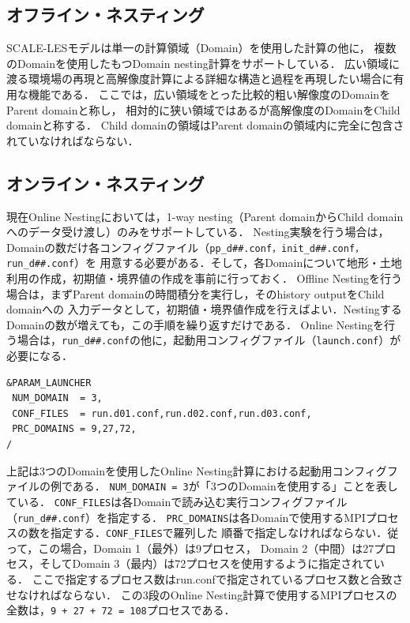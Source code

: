 \subsection{オフライン・ネスティング}

SCALE-LESモデルは単一の計算領域（Domain）を使用した計算の他に，
複数のDomainを使用したもつDomain nesting計算をサポートしている．
広い領域に渡る環境場の再現と高解像度計算による詳細な構造と過程を再現したい場合に有用な機能である．
ここでは，広い領域をとった比較的粗い解像度のDomainをParent domainと称し，
相対的に狭い領域ではあるが高解像度のDomainをChild domainと称する．
Child domainの領域はParent domainの領域内に完全に包含されていなければならない．



\subsection{オンライン・ネスティング}




現在Online Nestingにおいては，1-way nesting（Parent domainからChild domainへのデータ受け渡し）のみをサポートしている．
Nesting実験を行う場合は，Domainの数だけ各コンフィグファイル（\verb|pp_d##.conf，init_d##.conf，run_d##.conf|）を
用意する必要がある．そして，各Domainについて地形・土地利用の作成，初期値・境界値の作成を事前に行っておく．
Offline Nestingを行う場合は，まずParent domainの時間積分を実行し，そのhistory outputをChild domainへの
入力データとして，初期値・境界値作成を行えばよい．NestingするDomainの数が増えても，この手順を繰り返すだけである．
Online Nestingを行う場合は，\verb|run_d##.conf|の他に，起動用コンフィグファイル（\verb|launch.conf|）が必要になる．

\vspace{0.5cm}
\begin{verbatim}
&PARAM_LAUNCHER
 NUM_DOMAIN  = 3,
 CONF_FILES  = run.d01.conf,run.d02.conf,run.d03.conf,
 PRC_DOMAINS = 9,27,72,
/
\end{verbatim}

上記は3つのDomainを使用したOnline Nesting計算における起動用コンフィグファイルの例である．
\verb|NUM_DOMAIN = 3|が「3つのDomainを使用する」ことを表している．
\verb|CONF_FILES|は各Domainで読み込む実行コンフィグファイル（\verb|run_d##.conf|）を指定する．
\verb|PRC_DOMAINS|は各Domainで使用するMPIプロセスの数を指定する．\verb|CONF_FILES|で羅列した
順番で指定しなければならない．従って，この場合，Domain 1（最外）は9プロセス，
Domain 2（中間）は27プロセス，そしてDomain 3（最内）は72プロセスを使用するように指定されている．
ここで指定するプロセス数はrun.confで指定されているプロセス数と合致させなければならない．
この3段のOnline Nesting計算で使用するMPIプロセスの全数は，\verb|9 + 27 + 72 = 108|プロセスである．

